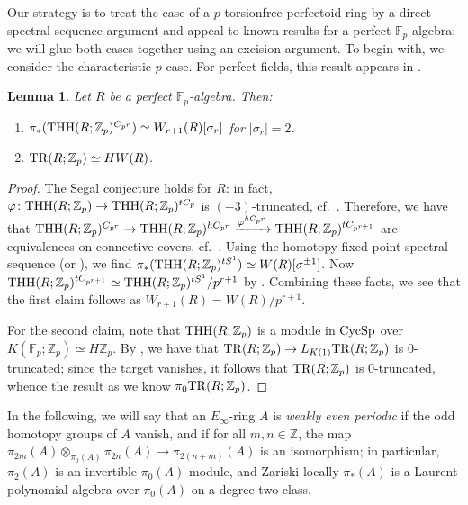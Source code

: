 \documentclass{amsart}
\newtheorem{lemma}[theorem]{Lemma}
\theoremstyle{definition}
\begin{document}
Our strategy is to treat the case of a $p$-torsionfree perfectoid ring by a direct
spectral sequence argument and appeal to known results for a perfect
$\mathbb{F}_p$-algebra; we will glue both cases together using an excision
argument. 
To begin with, we consider the characteristic $p$ case. 
For perfect fields, this result appears in  \cite[Sec.~5]{HM97}. 
\begin{lemma} 
\label{TRofperfectFP}
Let $R$ be a perfect $\mathbb{F}_p$-algebra. 
Then: 
\begin{enumerate}
\item  
$\pi_*(\mathrm{THH}(R; \mathbb{Z}_p)^{C_{p^r}}) \simeq W_{r+1}(R)[\sigma_r]$ for $|\sigma_r| =
2$. 
\item
$\mathrm{TR}(R; \mathbb{Z}_p) \simeq H W(R)$. 
\end{enumerate}
\end{lemma} 
\begin{proof} 
The Segal conjecture holds for $R$: in fact, $\varphi \colon \mathrm{THH}(R;
\mathbb{Z}_p) \to
\mathrm{THH}(R ; \mathbb{Z}_p)^{tC_p}$ is $(-3)$-truncated, cf.~\cite[Sec.~6]{BMS2}. 
Therefore, we have that 
$\mathrm{THH}(R; \mathbb{Z}_p)^{C_{p^r}} \to \mathrm{THH}(R; \mathbb{Z}_p)^{hC_{p^r}}
\xrightarrow{\varphi^{hC_{p^r}}}\mathrm{THH}(R; \mathbb{Z}_p)^{tC_{p^{r+1}}}$ are
equivalences on connective covers, cf.~\cite[Cor.~II.4.9]{NS18}. 
Using the homotopy fixed point spectral sequence (or \cite[Sec.~6]{BMS2}), we
find 
$\pi_*( \mathrm{THH}(R; \mathbb{Z}_p)^{tS^1}) \simeq W(R)[ \sigma^{\pm 1}]$. 
Now $\mathrm{THH}(R; \mathbb{Z}_p)^{tC_{p^{r+1}}} \simeq \mathrm{THH}(R;
\mathbb{Z}_p)^{tS^1}/p^{r+1}$ by \cite[Lem.~IV.4.12]{NS18}. 
Combining these facts, we see that  the first claim follows as $W_{r+1}(R) = W(R)/p^{r+1}$. 

For the second claim, 
note that $\mathrm{THH}(R; \mathbb{Z}_p)$ is a module in $\mathrm{CycSp}$ over $K(\mathbb{F}_p; \mathbb{Z}_p) \simeq
H\mathbb{Z}_p$. 
By , we have that 
$\mathrm{TR}(R; \mathbb{Z}_p) \to L_{K(1)} \mathrm{TR}(R; \mathbb{Z}_p)$ is 
$0$-truncated; since the target vanishes, it follows that $\mathrm{TR}(R; \mathbb{Z}_p)$
is $0$-truncated, whence the result as we know $\pi_0\mathrm{TR}(R; \mathbb{Z}_p)$. 
\end{proof} 

In the following, we will say that an $E_\infty$-ring $A$ is \emph{weakly even
periodic} if the odd homotopy groups of $A$ vanish, and if for all $m, n \in
\mathbb{Z}$, the map $\pi_{2m}(A) \otimes_{\pi_0(A)} \pi_{2n}(A) \to
\pi_{2(n+m)}(A)$ is an isomorphism; in particular, $\pi_2(A)$ is an invertible
$\pi_0(A)$-module, and Zariski locally $\pi_*(A)$ is a Laurent polynomial
algebra over $\pi_0(A)$ on a degree two class. 
\end{document}
